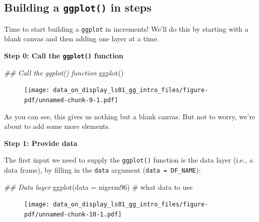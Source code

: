 \documentclass[
  letterpaper,
  DIV=11,
  numbers=noendperiod]{scrreprt}
\newenvironment{Shaded}{\begin{snugshade}}{\end{snugshade}}
\newcommand{\AttributeTok}[1]{\textcolor[rgb]{0.40,0.45,0.13}{#1}}
\newcommand{\CommentTok}[1]{\textcolor[rgb]{0.37,0.37,0.37}{#1}}
\newcommand{\DocumentationTok}[1]{\textcolor[rgb]{0.37,0.37,0.37}{\textit{#1}}}
\newcommand{\FunctionTok}[1]{\textcolor[rgb]{0.28,0.35,0.67}{#1}}
\newcommand{\NormalTok}[1]{\textcolor[rgb]{0.00,0.23,0.31}{#1}}
\begin{document}
\hypertarget{building-a-ggplot-in-steps}{%
\subsection{\texorpdfstring{Building a \texttt{ggplot()} in
steps}{Building a ggplot() in steps}}\label{building-a-ggplot-in-steps}}

Time to start building a \texttt{ggplot} in increments! We'll do this by
starting with a blank canvas and then adding one layer at a time.

\textbf{Step 0: Call the \texttt{ggplot()} function}

\begin{Shaded}
\begin{Highlighting}[]
\DocumentationTok{\#\# Call the \textasciigrave{}ggplot()\textasciigrave{} function}
\FunctionTok{ggplot}\NormalTok{()}
\end{Highlighting}
\end{Shaded}

\begin{figure}[H]

{\centering \texttt{[image: data\_on\_display\_ls01\_gg\_intro\_files/figure-pdf/unnamed-chunk-9-1.pdf]}

}

\end{figure}

As you can see, this gives us nothing but a blank canvas. But not to
worry, we're about to add some more elements.

\textbf{Step 1: Provide data}

The first input we need to supply the \texttt{ggplot()} function is the
data layer (i.e., a data frame), by filling in the \texttt{data}
argument (\texttt{data\ =\ DF\_NAME}):

\begin{Shaded}
\begin{Highlighting}[]
\DocumentationTok{\#\# Data layer}
\FunctionTok{ggplot}\NormalTok{(}\AttributeTok{data =}\NormalTok{ nigerm96)  }\CommentTok{\# what data to use}
\end{Highlighting}
\end{Shaded}

\begin{figure}[H]

{\centering \texttt{[image: data\_on\_display\_ls01\_gg\_intro\_files/figure-pdf/unnamed-chunk-10-1.pdf]}

}

\end{figure}
\end{document}
